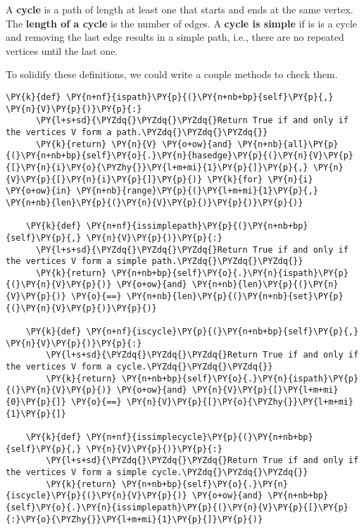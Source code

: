 A \textbf{cycle} is a path of length at least one that starts and ends at the same vertex.
The \textbf{length of a cycle} is the number of edges.
A \textbf{cycle is simple} if is is a cycle and removing the last edge results in a simple path, i.e., there are no repeated vertices until the last one.


To solidify these definitions, we could write a couple methods to check them.

\begin{Verbatim}[commandchars=\\\{\}]
    \PY{k}{def} \PY{n+nf}{ispath}\PY{p}{(}\PY{n+nb+bp}{self}\PY{p}{,} \PY{n}{V}\PY{p}{)}\PY{p}{:}
      \PY{l+s+sd}{\PYZdq{}\PYZdq{}\PYZdq{}Return True if and only if the vertices V form a path.\PYZdq{}\PYZdq{}\PYZdq{}}
      \PY{k}{return} \PY{n}{V} \PY{o+ow}{and} \PY{n+nb}{all}\PY{p}{(}\PY{n+nb+bp}{self}\PY{o}{.}\PY{n}{hasedge}\PY{p}{(}\PY{n}{V}\PY{p}{[}\PY{n}{i}\PY{o}{\PYZhy{}}\PY{l+m+mi}{1}\PY{p}{]}\PY{p}{,} \PY{n}{V}\PY{p}{[}\PY{n}{i}\PY{p}{]}\PY{p}{)} \PY{k}{for} \PY{n}{i} \PY{o+ow}{in} \PY{n+nb}{range}\PY{p}{(}\PY{l+m+mi}{1}\PY{p}{,} \PY{n+nb}{len}\PY{p}{(}\PY{n}{V}\PY{p}{)}\PY{p}{)}\PY{p}{)}

    \PY{k}{def} \PY{n+nf}{issimplepath}\PY{p}{(}\PY{n+nb+bp}{self}\PY{p}{,} \PY{n}{V}\PY{p}{)}\PY{p}{:}
      \PY{l+s+sd}{\PYZdq{}\PYZdq{}\PYZdq{}Return True if and only if the vertices V form a simple path.\PYZdq{}\PYZdq{}\PYZdq{}}
      \PY{k}{return} \PY{n+nb+bp}{self}\PY{o}{.}\PY{n}{ispath}\PY{p}{(}\PY{n}{V}\PY{p}{)} \PY{o+ow}{and} \PY{n+nb}{len}\PY{p}{(}\PY{n}{V}\PY{p}{)} \PY{o}{==} \PY{n+nb}{len}\PY{p}{(}\PY{n+nb}{set}\PY{p}{(}\PY{n}{V}\PY{p}{)}\PY{p}{)}

    \PY{k}{def} \PY{n+nf}{iscycle}\PY{p}{(}\PY{n+nb+bp}{self}\PY{p}{,} \PY{n}{V}\PY{p}{)}\PY{p}{:}
        \PY{l+s+sd}{\PYZdq{}\PYZdq{}\PYZdq{}Return True if and only if the vertices V form a cycle.\PYZdq{}\PYZdq{}\PYZdq{}}
        \PY{k}{return} \PY{n+nb+bp}{self}\PY{o}{.}\PY{n}{ispath}\PY{p}{(}\PY{n}{V}\PY{p}{)} \PY{o+ow}{and} \PY{n}{V}\PY{p}{[}\PY{l+m+mi}{0}\PY{p}{]} \PY{o}{==} \PY{n}{V}\PY{p}{[}\PY{o}{\PYZhy{}}\PY{l+m+mi}{1}\PY{p}{]}

    \PY{k}{def} \PY{n+nf}{issimplecycle}\PY{p}{(}\PY{n+nb+bp}{self}\PY{p}{,} \PY{n}{V}\PY{p}{)}\PY{p}{:}
        \PY{l+s+sd}{\PYZdq{}\PYZdq{}\PYZdq{}Return True if and only if the vertices V form a simple cycle.\PYZdq{}\PYZdq{}\PYZdq{}}
        \PY{k}{return} \PY{n+nb+bp}{self}\PY{o}{.}\PY{n}{iscycle}\PY{p}{(}\PY{n}{V}\PY{p}{)} \PY{o+ow}{and} \PY{n+nb+bp}{self}\PY{o}{.}\PY{n}{issimplepath}\PY{p}{(}\PY{n}{V}\PY{p}{[}\PY{p}{:}\PY{o}{\PYZhy{}}\PY{l+m+mi}{1}\PY{p}{]}\PY{p}{)}
\end{Verbatim}


